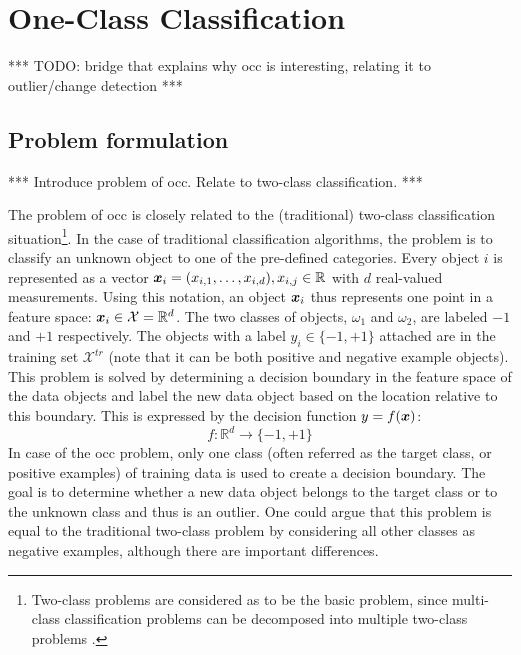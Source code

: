 \section{One-Class Classification}\label{sec:one_class_classification}

*** TODO: bridge that explains why \gls{occ} is interesting, relating it to outlier/change detection ***

\subsection{Problem formulation}\label{subsec:occ-problem-formulation}
*** Introduce problem of \gls{occ}. Relate to two-class classification. ***

The problem of \gls{occ} is closely related to the (traditional) two-class classification situation\footnote{Two-class problems are considered as to be the basic problem, since multi-class classification problems can be decomposed into multiple two-class problems \cite{fukunaga1990introduction}.}.
In the case of traditional classification algorithms, the problem is to classify an unknown object to one of the pre-defined categories.
Every object $i$ is represented as a vector $\vectorsym{x}_i = (x_{i,1},\dots,x_{i,d}), x_{i,j} \in \mathbb{R}$ with $d$ real-valued measurements.
Using this notation, an object $\vectorsym{x}_i$ thus represents one point in a feature space: $\vectorsym{x}_i \in \mathcal{X} = \mathbb{R}^d$.
The two classes of objects, $\omega_1$ and $\omega_2$, are labeled $-1$ and $+1$ respectively.
The objects with a label $y_i \in \{-1, +1\}$ attached are in the training set $\mathcal{X}^{tr}$ (note that it can be both positive and negative example objects).
This problem is solved by determining a decision boundary in the feature space of the data objects and label the new data object based on the location relative to this boundary.
This is expressed by the decision function $y = f(\vectorsym{x})$:
\begin{equation}\label{eq:decision_function_classification}
  f: \mathbb{R}^d \rightarrow \{-1, +1\}
\end{equation}
In case of the \gls{occ} problem, only one class (often referred as the target class, or positive examples) of training data is used to create a decision boundary.
The goal is to determine whether a new data object belongs to the target class or to the unknown class and thus is an outlier.
One could argue that this problem is equal to the traditional two-class problem by considering all other classes as negative examples, although there are important differences.
